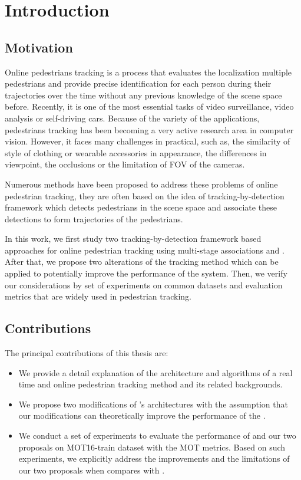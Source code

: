 \chapter{Introduction}
\section{Motivation}
\hspace{0.5cm}Online pedestrians tracking is a process that evaluates the localization multiple pedestrians
 and provide precise identification for each person during their trajectories over the time without any previous 
 knowledge of the scene space before. Recently, it is one of the most essential tasks of video surveillance, 
 video analysis or self-driving cars. Because of the variety of the applications, 
 pedestrians tracking has been becoming a very active research area in computer vision. However, 
 it faces many challenges in practical, such as, the similarity of style of clothing or wearable 
 accessories in appearance, 
the differences in viewpoint, the occlusions or the limitation of \acrshort{FOV} of the cameras.\par
Numerous methods have been proposed to address these problems of online pedestrian tracking, they are often based on the idea of tracking-by-detection framework which detects pedestrians in the scene space and associate these detections to form trajectories of the pedestrians.\par
In this work, we first study two tracking-by-detection framework based approaches for online pedestrian tracking using
multi-stage associations \cite{Wojke2017simple} and \cite{MultiTracking} . After that, we propose two alterations of the
tracking method \cite{Wojke2017simple} which can be applied to potentially improve the performance of the system. Then, we
verify our considerations by set of experiments on common datasets and evaluation metrics that are widely used in
pedestrian tracking.
\pagebreak
\section{Contributions}
\hspace{0.5cm} The principal contributions of this thesis are:
\begin{itemize}
    \item We provide a detail explanation of the architecture and algorithms of a real time and online pedestrian tracking method\cite{Wojke2017simple} and its related backgrounds.
    \item We propose two modifications of \cite{Wojke2017simple}'s architectures with the assumption that our modifications can theoretically improve the performance of the \cite{Wojke2017simple}.
    \item We conduct a set of experiments to evaluate the performance of \cite{Wojke2017simple} and our two proposals on MOT16-train dataset with the MOT metrics. Based on such experiments, we explicitly address the improvements and the limitations of our two proposals when compares with \cite{Wojke2017simple}.
\end{itemize}
